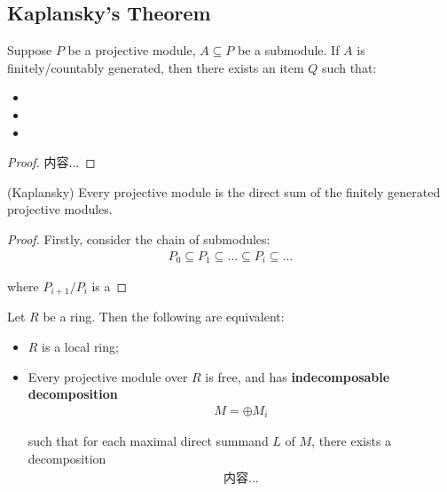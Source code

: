 \documentclass[Total.tex]{subfiles}
\begin{document}
			\subsection{Kaplansky's Theorem}
				\begin{lemma}
					Suppose $P$ be a projective module, $A\subseteq P$ be a submodule. If $A$ is finitely/countably generated, then there exists an item $Q$ such that:
					\begin{itemize}
						\item 
						\item 
						\item 
					\end{itemize}
				\end{lemma}
				\begin{proof}
					内容...
				\end{proof}
				\begin{theorem}
					(Kaplansky) Every projective module is the direct sum of the finitely generated projective modules.
				\end{theorem}
				\begin{proof}
					Firstly, consider the chain of submodules:
					\begin{gather*}
						P_0\subseteq P_1\subseteq \dots \subseteq P_i\subseteq \dots
					\end{gather*}
					
					where $P_{i+1}/P_i$ is a 
				\end{proof}
				
				\begin{theorem}
					Let $R$ be a ring. Then the following are equivalent:
					\begin{itemize}
						\item $R$ is a local ring;
						\item Every projective module over $R$ is free, and has \textbf{indecomposable decomposition}
						\begin{gather*}
							M=\oplus M_i
						\end{gather*}
						
						such that for each maximal direct summand $L$ of $M$, there exists a decomposition
						\begin{gather*}
							内容...
						\end{gather*}
					\end{itemize}
				\end{theorem}
\end{document}
